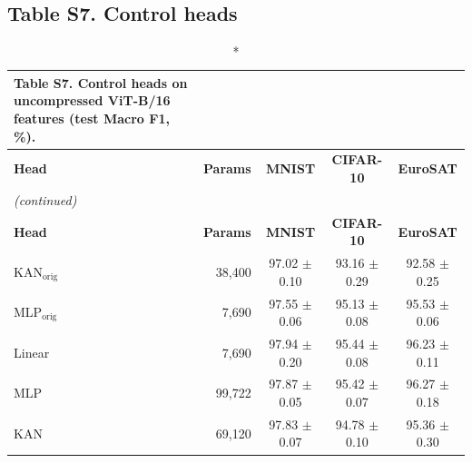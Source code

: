 \documentclass[10pt]{article}
\begin{document}
\subsection*{Table S7. Control heads}
\footnotesize
\setlength{\tabcolsep}{3pt}
\begin{longtable}{lrccc}
\caption*{\textbf{Table S7.} Control heads on uncompressed ViT-B/16 features (test Macro F1, \%).}\\
\toprule
\textbf{Head} & \textbf{Params} & \textbf{MNIST} & \textbf{CIFAR-10} & \textbf{EuroSAT} \\
\midrule
\endfirsthead
\multicolumn{5}{l}{\textit{(continued)}}\\
\toprule
\textbf{Head} & \textbf{Params} & \textbf{MNIST} & \textbf{CIFAR-10} & \textbf{EuroSAT} \\
\midrule
\endhead
\bottomrule
\endfoot
KAN$_{\mathrm{orig}}$ & 38,400 & 97.02 $\pm$ 0.10 & 93.16 $\pm$ 0.29 & 92.58 $\pm$ 0.25 \\
MLP$_{\mathrm{orig}}$ & 7,690 & 97.55 $\pm$ 0.06 & 95.13 $\pm$ 0.08 & 95.53 $\pm$ 0.06 \\
Linear & 7,690 & 97.94 $\pm$ 0.20 & 95.44 $\pm$ 0.08 & 96.23 $\pm$ 0.11 \\
MLP & 99,722 & 97.87 $\pm$ 0.05 & 95.42 $\pm$ 0.07 & 96.27 $\pm$ 0.18 \\
KAN & 69,120 & 97.83 $\pm$ 0.07 & 94.78 $\pm$ 0.10 & 95.36 $\pm$ 0.30 \\
\end{longtable}
\normalsize
\end{document}
